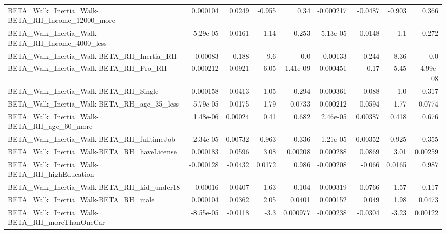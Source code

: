 \begin{tabular}{lrrrrrrrr}
BETA\_Walk\_Inertia\_Walk-BETA\_RH\_Income\_12000\_more   &    0.000104 &       0.0249 &   -0.955 &     0.34 &  -0.000217 &     -0.0487 &       -0.903 &         0.366 \\
BETA\_Walk\_Inertia\_Walk-BETA\_RH\_Income\_4000\_less    &    5.29e-05 &       0.0161 &     1.14 &    0.253 &  -5.13e-05 &     -0.0148 &          1.1 &         0.272 \\
BETA\_Walk\_Inertia\_Walk-BETA\_RH\_Inertia\_RH          &    -0.00083 &       -0.188 &     -9.6 &      0.0 &   -0.00133 &      -0.244 &        -8.36 &           0.0 \\
BETA\_Walk\_Inertia\_Walk-BETA\_RH\_Pro\_RH              &   -0.000212 &      -0.0921 &    -6.05 & 1.41e-09 &  -0.000451 &       -0.17 &        -5.45 &      4.99e-08 \\
BETA\_Walk\_Inertia\_Walk-BETA\_RH\_Single              &   -0.000158 &      -0.0413 &     1.05 &    0.294 &  -0.000361 &      -0.088 &          1.0 &         0.317 \\
BETA\_Walk\_Inertia\_Walk-BETA\_RH\_age\_35\_less         &    5.79e-05 &       0.0175 &    -1.79 &   0.0733 &   0.000212 &      0.0594 &        -1.77 &        0.0774 \\
BETA\_Walk\_Inertia\_Walk-BETA\_RH\_age\_60\_more         &    1.48e-06 &      0.00024 &     0.41 &    0.682 &   2.46e-05 &     0.00387 &        0.418 &         0.676 \\
BETA\_Walk\_Inertia\_Walk-BETA\_RH\_fulltimeJob         &    2.34e-05 &      0.00732 &   -0.963 &    0.336 &  -1.21e-05 &    -0.00352 &       -0.925 &         0.355 \\
BETA\_Walk\_Inertia\_Walk-BETA\_RH\_haveLicense         &    0.000183 &       0.0596 &     3.08 &  0.00208 &   0.000288 &      0.0869 &         3.01 &       0.00259 \\
BETA\_Walk\_Inertia\_Walk-BETA\_RH\_highEducation       &   -0.000128 &      -0.0432 &   0.0172 &    0.986 &  -0.000208 &      -0.066 &       0.0165 &         0.987 \\
BETA\_Walk\_Inertia\_Walk-BETA\_RH\_kid\_under18         &    -0.00016 &      -0.0407 &    -1.63 &    0.104 &  -0.000319 &     -0.0766 &        -1.57 &         0.117 \\
BETA\_Walk\_Inertia\_Walk-BETA\_RH\_male                &    0.000104 &       0.0362 &     2.05 &   0.0401 &   0.000152 &       0.049 &         1.98 &        0.0473 \\
BETA\_Walk\_Inertia\_Walk-BETA\_RH\_moreThanOneCar      &   -8.55e-05 &      -0.0118 &     -3.3 & 0.000977 &  -0.000238 &     -0.0304 &        -3.23 &       0.00122 \\

\end{tabular}

